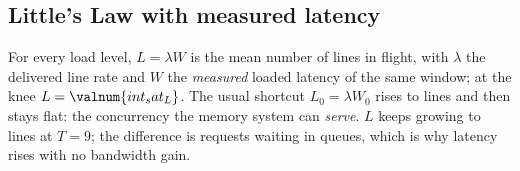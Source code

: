 \subsection{Little's Law with measured latency}
For every load level, $L = \lambda W$ \cite{little1961proof} is the mean number of lines in flight, with
$\lambda$ the delivered line rate and $W$ the \emph{measured} loaded latency of the same window; at the knee
$L=\valnum{int_sat_L}$. The usual shortcut $L_0 = \lambda W_0$ rises to  lines and then
stays flat: the concurrency the memory system can \emph{serve}. $L$ keeps growing to  lines
at $T=9$; the difference is requests waiting in queues, which is why latency rises with no bandwidth gain.

\begin{table}[htb]
  \centering\small
  \caption{Little's Law across the thread sweep (no injection delay), generated from
  . $\lambda$ = delivered lines/s (\qty{64}{\byte} lines), $W$ = loaded probe
  latency, $L=\lambda W$; $L_0=\lambda W_0$ with the unloaded $W_0$.}\label{tab:littles-law}
\end{table}

